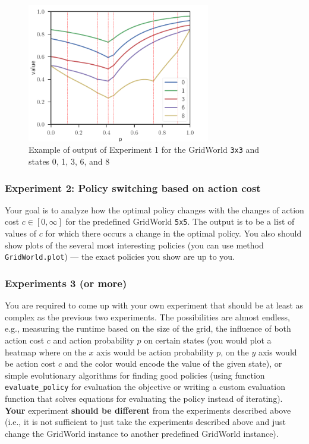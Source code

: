 \documentclass[10pt,journal,compsoc,twoside]{IEEEtran}
\begin{document}
\begin{figure}[t]
    \includegraphics[width=8cm]{figures/experiment_1_3x3.pdf}
    \centering
    \caption{Example of output of Experiment 1 for the GridWorld \texttt{3x3} and states 0, 1, 3, 6, and 8}
    \label{fig:experiment_1_3x3}
\end{figure}


\subsubsection{Experiment 2: Policy switching based on action cost}
Your goal is to analyze how the optimal policy changes with the changes of action cost $c \in [0,\infty]$ for the predefined GridWorld \texttt{5x5}. The output is to be a list of values of $c$ for which there occurs a change in the optimal policy. You also should show plots of the several most interesting policies (you can use method \lstinline{GridWorld.plot}) --- the exact policies you show are up to you.

\subsubsection{Experiments 3 (or more)}
You are required to come up with your own experiment that should be at least as complex as the previous two experiments. The possibilities are almost endless, e.g., measuring the runtime based on the size of the grid, the influence of both action cost $c$ and action probability $p$ on certain states (you would plot a heatmap where on the $x$ axis would be action probability $p$, on the $y$ axis would be action cost $c$ and the color would encode the value of the given state), or simple evolutionary algorithms for finding good policies (using function \lstinline{evaluate_policy} for evaluation the objective or writing a custom evaluation function that solves equations for evaluating the policy instead of iterating). \textbf{Your } experiment  \textbf{should be different} from the experiments described above (i.e., it is not sufficient to just take the experiments described above and just change the GridWorld instance to another predefined GridWorld instance).
\end{document}
